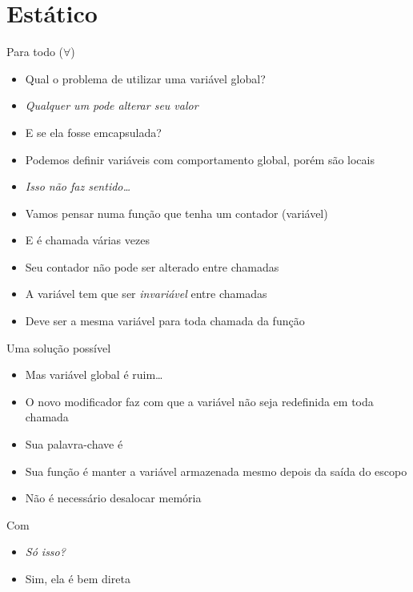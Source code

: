 \documentclass[14pt]{beamer}
\begin{document}
	\section{Estático}
		\begin{frame}{Para todo ($\forall$)}
			\begin{itemize}
				\presentationPause\item Qual o problema de utilizar uma variável global?
				\presentationPause\item \textit{Qualquer um pode alterar seu valor}
				\presentationPause\item E se ela fosse emcapsulada?
				\presentationPause\item Podemos definir variáveis com comportamento global, porém são locais
				\presentationPause\item \textit{Isso não faz sentido\dots}
				\presentationPause\item Vamos pensar numa função que tenha um contador (variável)
				\presentationPause\item E é chamada várias vezes
				\presentationPause\item Seu contador não pode ser alterado entre chamadas
				\presentationPause\item A variável tem que ser \emph{invariável} entre chamadas
				\presentationPause\item Deve ser a mesma variável para toda chamada da função
			\end{itemize}
		\end{frame}

		\begin{frame}{Uma solução possível}
			\presentationPause
			\begin{itemize}
				\presentationPause\item Mas variável global é ruim\dots
				\presentationPause\item O novo modificador faz com que a variável não seja redefinida em toda chamada
				\presentationPause\item Sua palavra-chave é 
				\presentationPause\item Sua função é manter a variável armazenada mesmo depois da saída do escopo
				\presentationPause\item Não é necessário desalocar memória
			\end{itemize}
		\end{frame}

		\begin{frame}{Com }
			\presentationPause
			\begin{itemize}
				\presentationPause\item \textit{Só isso?}
				\presentationPause\item Sim, ela é bem direta
			\end{itemize}
		\end{frame}
\end{document}

